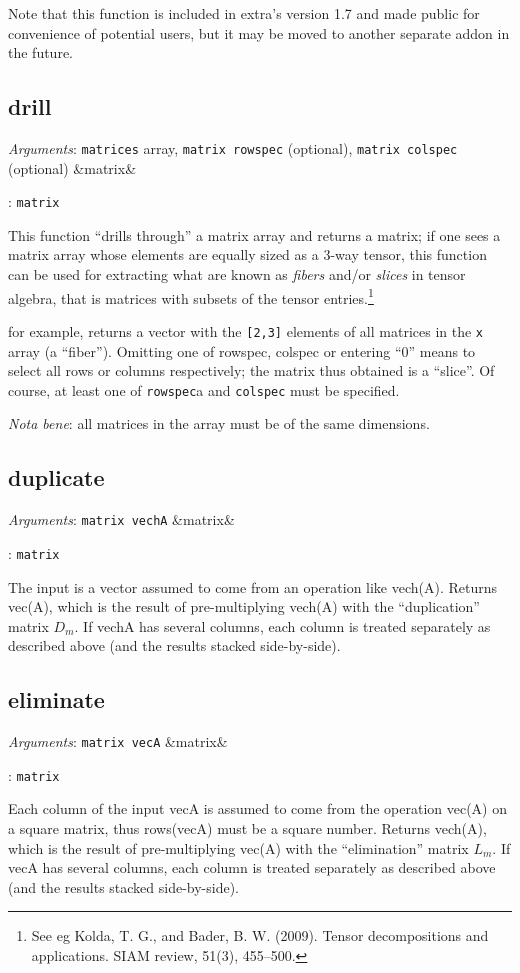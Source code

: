 \documentclass[11pt,english]{article}
\newcommand{\ArgRet}[2]{%
  {\it Arguments}: {#1}%
  \ifx&#2&%
  \else
  \par\smallskip\noindent {\it Return type}: \texttt{#2}
  \fi%
  \par\medskip\par%
  }
\begin{document}
Note that this function is included in extra's version 1.7 and made
public for convenience of potential users, but it may be moved to
another separate addon in the future.


\subsection{drill}

\ArgRet{\texttt{matrices} array, \texttt{matrix rowspec} (optional),
  \texttt{matrix colspec} (optional)}{matrix}

This function ``drills through'' a matrix array and returns a matrix;
if one sees a matrix array whose elements are equally sized as a 3-way
tensor, this function can be used for extracting what are known as
\emph{fibers} and/or \emph{slices} in tensor algebra, that is matrices with
subsets of the tensor entries.\footnote{See eg Kolda, T. G., and
  Bader, B. W. (2009). Tensor decompositions and applications. SIAM
  review, 51(3), 455--500.}

for example,  returns a vector with the
\texttt{[2,3]} elements of all matrices in the \texttt{x} array (a
``fiber''). Omitting one of rowspec, colspec or entering ``0'' means
to select all rows or columns respectively; the matrix thus obtained
is a ``slice''. Of course, at least one of \texttt{rowspec}a and
\texttt{colspec} must be specified.

\emph{Nota bene}: all matrices in the array must be of the same
dimensions.

\subsection{duplicate}

\ArgRet{\texttt{matrix vechA}}{matrix}

The input is a vector assumed to come from an operation like vech(A).
Returns vec(A), which is the result of pre-multiplying vech(A) with
the ``duplication'' matrix $D_m$. If vechA has several columns, each
column is treated separately as described above (and the results
stacked side-by-side).

\subsection{eliminate}

\ArgRet{\texttt{matrix vecA}}{matrix}

Each column of the input vecA is assumed to come from the operation
vec(A) on a square matrix, thus rows(vecA) must be a square number.
Returns vech(A), which is the result of pre-multiplying vec(A) with
the ``elimination'' matrix $L_m$.  If vecA has several columns, each
column is treated separately as described above (and the results
stacked side-by-side).
\end{document}
